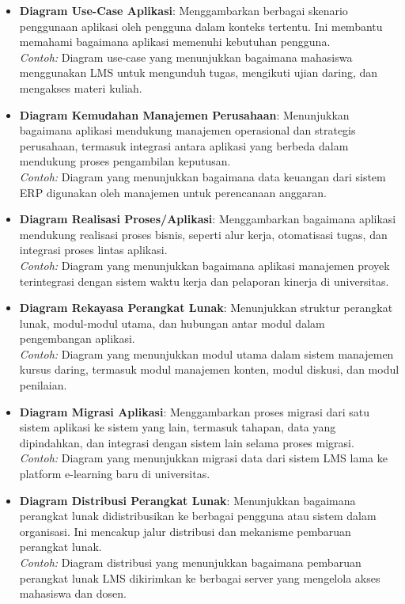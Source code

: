 \begin{itemize}
\begin{itemize}
		\item \textbf{Diagram Use-Case Aplikasi}: Menggambarkan berbagai skenario penggunaan aplikasi oleh pengguna dalam konteks tertentu. Ini membantu memahami bagaimana aplikasi memenuhi kebutuhan pengguna. \\
		\textit{Contoh:} Diagram use-case yang menunjukkan bagaimana mahasiswa menggunakan LMS untuk mengunduh tugas, mengikuti ujian daring, dan mengakses materi kuliah.
		
		\item \textbf{Diagram Kemudahan Manajemen Perusahaan}: Menunjukkan bagaimana aplikasi mendukung manajemen operasional dan strategis perusahaan, termasuk integrasi antara aplikasi yang berbeda dalam mendukung proses pengambilan keputusan. \\
		\textit{Contoh:} Diagram yang menunjukkan bagaimana data keuangan dari sistem ERP digunakan oleh manajemen untuk perencanaan anggaran.
		
		\item \textbf{Diagram Realisasi Proses/Aplikasi}: Menggambarkan bagaimana aplikasi mendukung realisasi proses bisnis, seperti alur kerja, otomatisasi tugas, dan integrasi proses lintas aplikasi. \\
		\textit{Contoh:} Diagram yang menunjukkan bagaimana aplikasi manajemen proyek terintegrasi dengan sistem waktu kerja dan pelaporan kinerja di universitas.
		
		\item \textbf{Diagram Rekayasa Perangkat Lunak}: Menunjukkan struktur perangkat lunak, modul-modul utama, dan hubungan antar modul dalam pengembangan aplikasi. \\
		\textit{Contoh:} Diagram yang menunjukkan modul utama dalam sistem manajemen kursus daring, termasuk modul manajemen konten, modul diskusi, dan modul penilaian.
		
		\item \textbf{Diagram Migrasi Aplikasi}: Menggambarkan proses migrasi dari satu sistem aplikasi ke sistem yang lain, termasuk tahapan, data yang dipindahkan, dan integrasi dengan sistem lain selama proses migrasi. \\
		\textit{Contoh:} Diagram yang menunjukkan migrasi data dari sistem LMS lama ke platform e-learning baru di universitas.
		
		\item \textbf{Diagram Distribusi Perangkat Lunak}: Menunjukkan bagaimana perangkat lunak didistribusikan ke berbagai pengguna atau sistem dalam organisasi. Ini mencakup jalur distribusi dan mekanisme pembaruan perangkat lunak. \\
		\textit{Contoh:} Diagram distribusi yang menunjukkan bagaimana pembaruan perangkat lunak LMS dikirimkan ke berbagai server yang mengelola akses mahasiswa dan dosen.
	\end{itemize}
\end{itemize}

